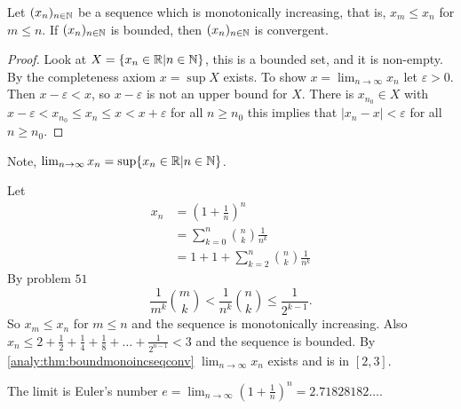\documentclass[10pt, a4paper]{article}
\newcommand{\seq}[1][x]{(#1_n)_{n \in \N}}
\begin{document}
\begin{theorem}\label{analy:thm:boundmonoincseqconv}
    Let $\seq$ be a sequence which is monotonically increasing,
    that is,
    $x_m \leq x_n$ for $m \leq n$.
    If $\seq$ is bounded,
    then $\seq$ is convergent.
    \begin{proof}
        Look at $X = \{x_n \in \mathbb{R} | n \in \mathbb{N}\}$,
        this is a bounded set,
        and it is non-empty.
        By the completeness axiom $x = \sup X$ exists.
        To show $x = \lim_{n \to \infty}x_n$
        let $\varepsilon > 0$.
        Then $x - \varepsilon < x$,
        so $x - \varepsilon$ is not an upper bound for $X$.
        There is $x_{n_0} \in X$ with
        $x - \varepsilon < x_{n_0} \leq x_n \leq x < x + \varepsilon$ for all $n \geq n_0$
        this implies that
        $|x_n - x| < \varepsilon$ for all $n \geq n_0$.
    \end{proof}
\end{theorem}
Note, $\lim_{n \to \infty}x_n = \sup\{x_n \in \mathbb{R} | n \in \mathbb{N}\}$.
\begin{example}
    Let
    \begin{align*}
        x_n &= \left(1 + \frac{1}{n}\right) ^ n \\
        &= \sum_{k = 0}^{n}\binom{n}{k}\frac{1}{n ^ k} \\
        &= 1 + 1 + \sum_{k = 2}^{n}\binom{n}{k}\frac{1}{n ^ k}
    \end{align*}
    By problem $51$
    \[
    \frac{1}{m ^ k}\binom{m}{k} < \frac{1}{n ^ k}\binom{n}{k} \leq \frac{1}{2 ^ {k - 1}}.
    \]
    So $x_m \leq x_n$ for $m \leq n$ and the sequence is monotonically increasing.
    Also $x_n \leq 2 + \frac{1}{2} + \frac{1}{4} + \frac{1}{8} + \dotsc + \frac{1}{2 ^ {n - 1}} < 3$
    and the sequence is bounded.
    By \autoref{analy:thm:boundmonoincseqconv} $\lim_{n \to \infty}x_n$ exists and is in $[2, 3]$.
    
    The limit is Euler's number $e = \displaystyle\lim_{n \to \infty}\left(1 + \frac{1}{n}\right) ^ n = 2.71828182\dotsc$.
\end{example}
\end{document}
